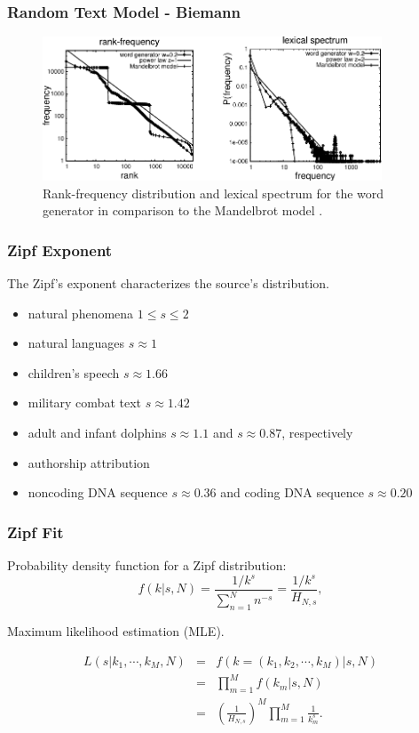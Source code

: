 \documentclass[notes]{beamer}
\begin{document}
\frame
{
  \frametitle{Random Text Model - Biemann}
    \begin{figure}[h!]
    \centering
    \includegraphics[width=0.9\textwidth]{imagespresentation/biemann.pdf}
    \caption{Rank-frequency distribution and lexical spectrum for the word generator in comparison to the Mandelbrot model \citep{biemann2007}.}
    \label{fig:biemann}
    \end{figure}
}




\frame
{
  \frametitle{Zipf Exponent}

  The Zipf's exponent characterizes the source's distribution.

  \begin{itemize}
  \item natural phenomena $1 \leq s \leq 2$ \citep{baek2011}
  \item natural languages $s \approx 1$ \citep{piotrovskii}
  \item children's speech $s \approx 1.66$ \citep{piotrovskii}
  \item military combat text $s \approx 1.42$ \citep{kolguskin1960}
  \item adult and infant dolphins $s \approx 1.1$ and $s \approx 0.87$, respectively \citep{mccowan1999}
  \item authorship attribution \citep{havlin1995}
  \item noncoding DNA sequence $s \approx 0.36$ and coding DNA sequence $s \approx 0.20$ \citep{mantegna1994}
  \end{itemize}
}

\frame
{
  \frametitle{Zipf Fit}
Probability density function for a Zipf distribution:
\begin{equation}
\label{eq:zipf_relation}
f(k | s, N) = \frac{1/k^s}{\sum_{n=1}^{N} n^{-s}} = \frac{1/k^s}{H_{N,s}} ,
\end{equation} 

Maximum likelihood estimation (MLE).

\begin{eqnarray}
L(s|k_1,\cdots,k_M,N) &=& f(k=(k_1, k_2, \cdots, k_M) | s, N) \nonumber \\ 
                      &=& \prod_{m=1}^{M} f(k_m | s, N) \nonumber \\
                      &=& \left( \frac{1}{H_{N,s}} \right)^M \prod_{m=1}^{M} \frac{1}{k_m^s} .
\end{eqnarray}

}
\end{document}

